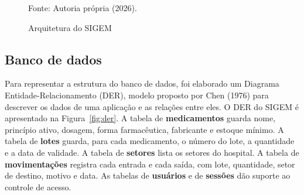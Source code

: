 \documentclass[12pt,a4paper]{article}
\begin{document}
\begin{figure}[!htbp]
  \centering
  \caption{Arquitetura do SIGEM}
  \label{fig:arquitetura}
  \par\smallskip
  {\small Fonte: Autoria própria (2026).}
\end{figure}

\subsection{Banco de dados}

Para representar a estrutura do banco de dados, foi elaborado um Diagrama Entidade-Relacionamento (DER), modelo proposto por Chen (1976) para descrever os dados de uma aplicação e as relações entre eles. O DER do SIGEM é apresentado na Figura~\ref{fig:der}. A tabela de \textbf{medicamentos} guarda nome, princípio ativo, dosagem, forma farmacêutica, fabricante e estoque mínimo. A tabela de \textbf{lotes} guarda, para cada medicamento, o número do lote, a quantidade e a data de validade. A tabela de \textbf{setores} lista os setores do hospital. A tabela de \textbf{movimentações} registra cada entrada e cada saída, com lote, quantidade, setor de destino, motivo e data. As tabelas de \textbf{usuários} e de \textbf{sessões} dão suporte ao controle de acesso.
\end{document}
